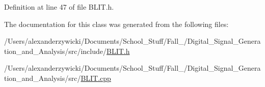 Definition at line 47 of file B\+L\+I\+T.\+h.



The documentation for this class was generated from the following files\+:\begin{DoxyCompactItemize}
\item 
/\+Users/alexanderzywicki/\+Documents/\+School\+\_\+\+Stuff/\+Fall\+\_/\+Digital\+\_\+\+Signal\+\_\+\+Generation\+\_\+and\+\_\+\+Analysis/src/include/\hyperlink{_b_l_i_t_8h}{B\+L\+I\+T.\+h}\item 
/\+Users/alexanderzywicki/\+Documents/\+School\+\_\+\+Stuff/\+Fall\+\_/\+Digital\+\_\+\+Signal\+\_\+\+Generation\+\_\+and\+\_\+\+Analysis/src/\hyperlink{_b_l_i_t_8cpp}{B\+L\+I\+T.\+cpp}\end{DoxyCompactItemize}
